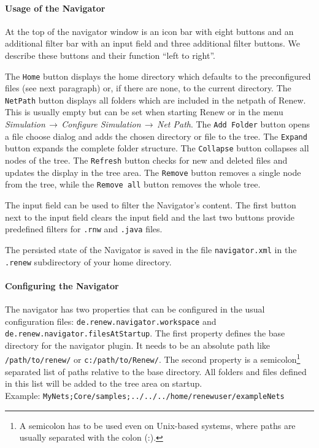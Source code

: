 \paragraph{Usage of the Navigator}
At the top of the navigator window is an icon bar with eight buttons and an additional filter bar with an input field and three additional filter buttons.
We describe these buttons and their function ``left to right''.

The \texttt{Home} button displays the home directory which defaults to the 
preconfigured files (see next paragraph) or, if there are none, to the current 
directory. 
The \texttt{NetPath} button displays all folders which are included in the netpath of Renew. This is usually empty but can be set when starting Renew or in the menu \textit{Simulation$\,\rightarrow\,$Configure Simulation$\,\rightarrow\,$Net Path}.
The \texttt{Add Folder} button opens a file choose dialog and adds the chosen directory or file to the tree.
The \texttt{Expand} button expands the complete folder structure.
The \texttt{Collapse} button collapses all nodes of the tree.
The \texttt{Refresh} button checks for new and deleted files and updates the display in the tree area.
The \texttt{Remove} button removes a single node from the tree, while the \texttt{Remove all} button removes the whole tree.

The input field can be used to filter the Navigator's content. The first button next to the input field clears the input field and the last two buttons provide predefined filters for \texttt{.rnw} and \texttt{.java} files.

The persisted state of the Navigator is saved in the file \texttt{navigator.xml} in the \texttt{.renew} subdirectory of your home directory.

\paragraph{Configuring the Navigator}
The navigator has two properties that can be configured in the usual
configuration files: \texttt{de.\allowbreak{}renew.\allowbreak{}navigator.\allowbreak{}workspace} and 
\texttt{de.\allowbreak{}renew.\allowbreak{}navigator.\allowbreak{}files\allowbreak{}At\allowbreak{}Startup}.
%
The first property defines the base directory for the navigator plugin.
It needs to be an absolute path like \texttt{/path/\allowbreak{}to/\allowbreak{}renew\renewversion{}/} or 
\texttt{c:/\allowbreak{}path/\allowbreak{}to/\allowbreak{}Renew\renewversion{}/}.
The second property is a semicolon\footnote{A semicolon has to be used even
on Unix-based systems, where paths are usually separated with the colon (:).} 
separated list of paths relative to the base directory. 
All folders and files defined in this list will be added to the tree 
area on startup.\\
Example: \texttt{MyNets;\allowbreak{}Core/\allowbreak{}samples;\allowbreak{}../\allowbreak{}../\allowbreak{}../\allowbreak{}home/\allowbreak{}renewuser/\allowbreak{}example\allowbreak{}Nets}


